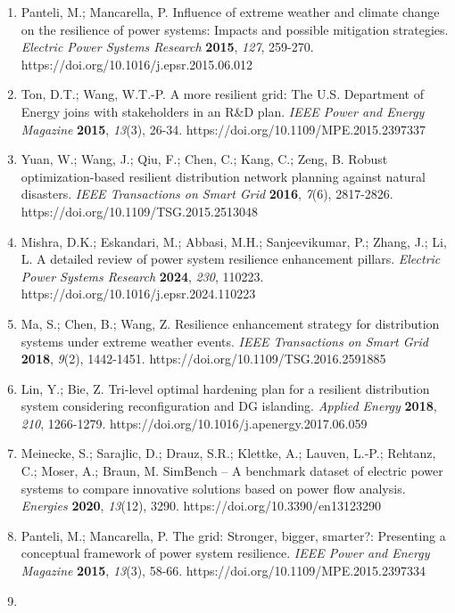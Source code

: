 \documentclass[
  10pt,
  a4paper,
]{article}
\begin{document}
\begin{enumerate}
\def\labelenumi{\arabic{enumi}.}
\item
  Panteli, M.; Mancarella, P. Influence of extreme weather and climate
  change on the resilience of power systems: Impacts and possible
  mitigation strategies. \emph{Electric Power Systems Research}
  \textbf{2015}, \emph{127}, 259-270.
  https://doi.org/10.1016/j.epsr.2015.06.012
\item
  Ton, D.T.; Wang, W.T.-P. A more resilient grid: The U.S. Department of
  Energy joins with stakeholders in an R\&D plan. \emph{IEEE Power and
  Energy Magazine} \textbf{2015}, \emph{13}(3), 26-34.
  https://doi.org/10.1109/MPE.2015.2397337
\item
  Yuan, W.; Wang, J.; Qiu, F.; Chen, C.; Kang, C.; Zeng, B. Robust
  optimization-based resilient distribution network planning against
  natural disasters. \emph{IEEE Transactions on Smart Grid}
  \textbf{2016}, \emph{7}(6), 2817-2826.
  https://doi.org/10.1109/TSG.2015.2513048
\item
  Mishra, D.K.; Eskandari, M.; Abbasi, M.H.; Sanjeevikumar, P.; Zhang,
  J.; Li, L. A detailed review of power system resilience enhancement
  pillars. \emph{Electric Power Systems Research} \textbf{2024},
  \emph{230}, 110223. https://doi.org/10.1016/j.epsr.2024.110223
\item
  Ma, S.; Chen, B.; Wang, Z. Resilience enhancement strategy for
  distribution systems under extreme weather events. \emph{IEEE
  Transactions on Smart Grid} \textbf{2018}, \emph{9}(2), 1442-1451.
  https://doi.org/10.1109/TSG.2016.2591885
\item
  Lin, Y.; Bie, Z. Tri-level optimal hardening plan for a resilient
  distribution system considering reconfiguration and DG islanding.
  \emph{Applied Energy} \textbf{2018}, \emph{210}, 1266-1279.
  https://doi.org/10.1016/j.apenergy.2017.06.059
\item
  Meinecke, S.; Sarajlic, D.; Drauz, S.R.; Klettke, A.; Lauven, L.-P.;
  Rehtanz, C.; Moser, A.; Braun, M. SimBench -- A benchmark dataset of
  electric power systems to compare innovative solutions based on power
  flow analysis. \emph{Energies} \textbf{2020}, \emph{13}(12), 3290.
  https://doi.org/10.3390/en13123290
\item
  Panteli, M.; Mancarella, P. The grid: Stronger, bigger, smarter?:
  Presenting a conceptual framework of power system resilience.
  \emph{IEEE Power and Energy Magazine} \textbf{2015}, \emph{13}(3),
  58-66. https://doi.org/10.1109/MPE.2015.2397334
\item

\end{enumerate}
\end{document}
